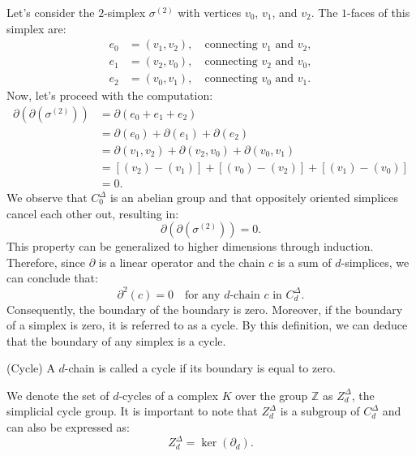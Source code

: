\begin{example}
	Let's consider the $2$-simplex $\sigma^{(2)}$ with vertices $v_{0}$, $v_{1}$, and
	$v_{2}$. The $1$-faces of this simplex are:
	\begin{align}
		e_{0} & = (v_{1}, v_{2}), \quad \text{connecting }v_{1} \text{ and }v_{2}, \\
		e_{1} & = (v_{2}, v_{0}), \quad \text{connecting }v_{2} \text{ and }v_{0}, \\
		e_{2} & = (v_{0}, v_{1}), \quad \text{connecting }v_{0} \text{ and }v_{1}.
	\end{align}
	Now, let's proceed with the computation:
	\begin{align}
		\partial(\partial(\sigma^{(2)})) & = \partial(e_{0} + e_{1} + e_{2}) \nonumber                                          \\
		                                 & = \partial(e_{0}) + \partial(e_{1}) + \partial(e_{2}) \nonumber                      \\
		                                 & = \partial(v_{1}, v_{2}) + \partial(v_{2}, v_{0}) + \partial(v_{0}, v_{1}) \nonumber \\
		                                 & = [(v_{2}) - (v_{1})] + [(v_{0}) - (v_{2})] + [(v_{1}) - (v_{0})] \nonumber          \\
		                                 & = 0.
	\end{align}
	We observe that $C^{\Delta}_{0}$ is an abelian group and that oppositely oriented
	simplices cancel each other out, resulting in:
	\[
		\partial(\partial(\sigma^{(2)})) = 0.
	\]
	This property can be generalized to higher dimensions through induction.
	Therefore, since $\partial$ is a linear operator and the chain $c$ is a sum of
	$d$-simplices, we can conclude that:
	\[
		\partial^{2}(c) = 0 \quad \text{for any $d$-chain $c$ in }C^{\Delta}_{d}.
	\]
	Consequently, the boundary of the boundary is zero. Moreover, if the boundary
	of a simplex is zero, it is referred to as a cycle. By this definition, we can
	deduce that the boundary of any simplex is a cycle.
\end{example}

\begin{definition}
	{(Cycle) \cite[p.106]{hatcher2005algebraic}} A $d$-chain is called a cycle if its
	boundary is equal to zero.
\end{definition}

We denote the set of $d$-cycles of a complex $K$ over the group $\mathbb{Z}$ as $Z
^{\Delta}_{d}$, the simplicial cycle group. It is important to note that $Z^{\Delta}
_{d}$ is a subgroup of $C^{\Delta}_{d}$ and can also be expressed as:
\[
	Z^{\Delta}_{d} = \ker(\partial_{d}).
\]

